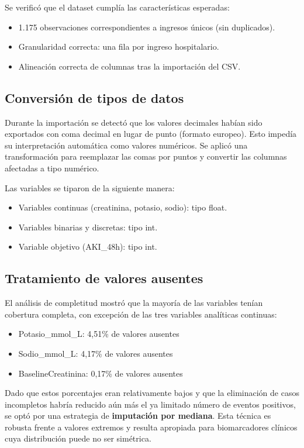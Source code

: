 \documentclass[12pt, a4paper, oneside]{report}
\begin{document}
Se verificó que el dataset cumplía las características esperadas:

\begin{itemize}
    \item 1.175 observaciones correspondientes a ingresos únicos (sin duplicados).
    \item Granularidad correcta: una fila por ingreso hospitalario.
    \item Alineación correcta de columnas tras la importación del CSV.
\end{itemize}

\subsection{Conversión de tipos de datos}

Durante la importación se detectó que los valores decimales habían sido exportados con coma decimal en lugar de punto (formato europeo). Esto impedía su interpretación automática como valores numéricos. Se aplicó una transformación para reemplazar las comas por puntos y convertir las columnas afectadas a tipo numérico.

Las variables se tiparon de la siguiente manera:
\begin{itemize}
    \item Variables continuas (creatinina, potasio, sodio): tipo float.
    \item Variables binarias y discretas: tipo int.
    \item Variable objetivo (AKI\_48h): tipo int.
\end{itemize}

\subsection{Tratamiento de valores ausentes}

El análisis de completitud mostró que la mayoría de las variables tenían cobertura completa, con excepción de las tres variables analíticas continuas:

\begin{itemize}
    \item Potasio\_mmol\_L: 4,51\% de valores ausentes
    \item Sodio\_mmol\_L: 4,17\% de valores ausentes
    \item BaselineCreatinina: 0,17\% de valores ausentes
\end{itemize}

Dado que estos porcentajes eran relativamente bajos y que la eliminación de casos incompletos habría reducido aún más el ya limitado número de eventos positivos, se optó por una estrategia de \textbf{imputación por mediana}. Esta técnica es robusta frente a valores extremos y resulta apropiada para biomarcadores clínicos cuya distribución puede no ser simétrica.
\end{document}
